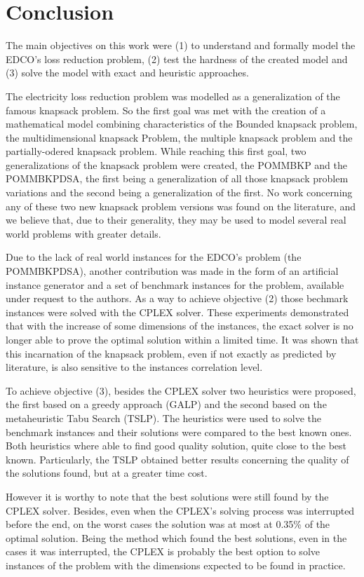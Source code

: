 \section{Conclusion}
\label{sec:conclu}
The main objectives on this work were (1) to understand and formally model the EDCO's loss reduction problem, (2) test the hardness
of the created model and (3) solve the model with exact and heuristic approaches.

The electricity loss reduction problem was modelled as a generalization of the famous knapsack problem. So the first goal was met
with the creation of a mathematical model combining characteristics of the Bounded knapsack problem, the multidimensional knapsack
Problem, the multiple knapsack problem and the partially-odered knapsack problem. While reaching this first goal, two 
generalizations of the knapsack problem were created, the POMMBKP and the POMMBKPDSA, the first being a generalization of
all those knapsack problem variations and the second being a generalization of the first. No work concerning any of these two new 
knapsack problem versions was found on the literature, and we believe that, due to their generality, they may be used to model 
several real world problems with greater details.

Due to the lack of real world instances for the EDCO's problem (the POMMBKPDSA), another contribution was made in the form of an 
artificial instance generator and a set of benchmark instances for the problem, available under request to the authors. As a way to achieve objective (2)
those bechmark instances were solved with the CPLEX solver. These experiments demonstrated that with the increase of some dimensions
of the instances, the exact solver is no longer able to prove the optimal solution within a limited time. It was shown that this 
incarnation of the knapsack problem, even if not exactly as predicted by literature, is also sensitive to the instances correlation level.

To achieve objective (3), besides the CPLEX solver two heuristics were proposed, the first based on a greedy approach (GALP) and the second based 
on the metaheuristic Tabu Search (TSLP). The heuristics were used to solve the benchmark instances and their solutions were compared to the best
known ones. Both heuristics where able to find good quality solution, quite close to the best known. Particularly, the TSLP obtained better results
concerning the quality of the solutions found, but at a greater time cost.

However it is worthy to note that the best solutions were still found by the CPLEX solver. Besides, even when the CPLEX's solving 
process was interrupted before the end, on the worst cases the solution was at most at 0.35\% of the optimal solution. Being the method which
found the best solutions, even in the cases it was interrupted, the CPLEX is probably the best option 
to solve instances of the problem with the dimensions expected to be found in practice.
